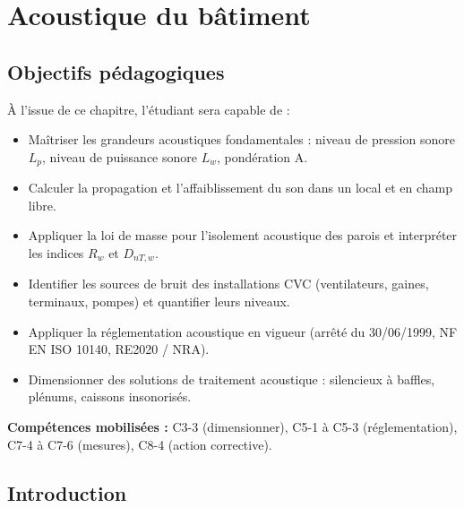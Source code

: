 
\chapter{Acoustique du bâtiment}

\section{Objectifs pédagogiques}

À l'issue de ce chapitre, l'étudiant sera capable de :

\begin{itemize}
  \item Maîtriser les grandeurs acoustiques fondamentales : niveau de pression sonore $L_p$, niveau de puissance sonore $L_w$, pondération A.
  \item Calculer la propagation et l'affaiblissement du son dans un local et en champ libre.
  \item Appliquer la loi de masse pour l'isolement acoustique des parois et interpréter les indices $R_w$ et $D_{nT,w}$.
  \item Identifier les sources de bruit des installations CVC (ventilateurs, gaines, terminaux, pompes) et quantifier leurs niveaux.
  \item Appliquer la réglementation acoustique en vigueur (arrêté du 30/06/1999, NF EN ISO 10140, RE2020 / NRA).
  \item Dimensionner des solutions de traitement acoustique : silencieux à baffles, plénums, caissons insonorisés.
\end{itemize}

\textbf{Compétences mobilisées :} C3-3 (dimensionner), C5-1 à C5-3 (réglementation), C7-4 à C7-6 (mesures), C8-4 (action corrective).

\section{Introduction}

